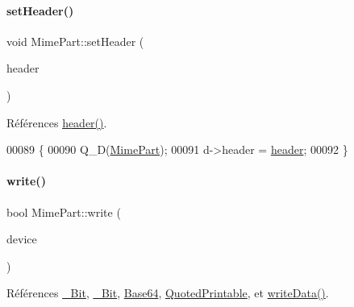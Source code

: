 \paragraph{\texorpdfstring{set\+Header()}{setHeader()}}
{\footnotesize\ttfamily void Mime\+Part\+::set\+Header (\begin{DoxyParamCaption}\item[{const Q\+Byte\+Array \&}]{header }\end{DoxyParamCaption})}



Références \hyperlink{class_simple_mail_1_1_mime_part_a87f3646cf7e63664d3d92d087afd76ae}{header()}.


\begin{DoxyCode}
00089 \{
00090     Q\_D(\hyperlink{class_simple_mail_1_1_mime_part}{MimePart});
00091     d->header = \hyperlink{class_simple_mail_1_1_mime_part_a87f3646cf7e63664d3d92d087afd76ae}{header};
00092 \}
\end{DoxyCode}
\mbox{\label{class_simple_mail_1_1_mime_part_a4de9e52dca51bdc87cf526970606910d}} 
\paragraph{\texorpdfstring{write()}{write()}}
{\footnotesize\ttfamily bool Mime\+Part\+::write (\begin{DoxyParamCaption}\item[{Q\+I\+O\+Device $\ast$}]{device }\end{DoxyParamCaption})}



Références \hyperlink{class_simple_mail_1_1_mime_part_ae67a2f5406958b95b18bf31a7bbeb5c9a93d518d86036ce6f149ffa646b52235a}{\+\_\+Bit}, \hyperlink{class_simple_mail_1_1_mime_part_ae67a2f5406958b95b18bf31a7bbeb5c9a27c1574a6fe2fa936ae6cfe9654bb37f}{\+\_\+Bit}, \hyperlink{class_simple_mail_1_1_mime_part_ae67a2f5406958b95b18bf31a7bbeb5c9ae644dc14ba856889814d2da9c995b91a}{Base64}, \hyperlink{class_simple_mail_1_1_mime_part_ae67a2f5406958b95b18bf31a7bbeb5c9a29b5533d69a04cfef2c3ff6538c44db0}{Quoted\+Printable}, et \hyperlink{class_simple_mail_1_1_mime_part_ab8b85a3cf47e6bd8d2051dfa5c56c36a}{write\+Data()}.


